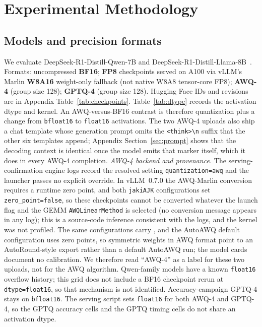\documentclass[11pt,a4paper]{article}
\begin{document}
\section{Experimental Methodology}
\subsection{Models and precision formats}
\label{sec:formats}
We evaluate DeepSeek-R1-Distill-Qwen-7B and DeepSeek-R1-Distill-Llama-8B~\cite{guo2025deepseekr1}. Formats: uncompressed \textbf{BF16}; \textbf{FP8} checkpoints served on A100 via vLLM's Marlin \textbf{W8A16} weight-only fallback (not native W8A8 tensor-core FP8); \textbf{AWQ-4} (group size 128); \textbf{GPTQ-4} (group size 128). Hugging Face IDs and revisions are in Appendix Table~\ref{tab:checkpoints}. Table~\ref{tab:dtype} records the activation dtype and kernel. An AWQ-versus-BF16 contrast is therefore quantization plus a change from \texttt{bfloat16} to \texttt{float16} activations. The two AWQ-4 uploads also ship a chat template whose generation prompt omits the \texttt{<think>\textbackslash n} suffix that the other six templates append; Appendix Section~\ref{sec:prompt} shows that the decoding context is identical once the model emits that marker itself, which it does in every AWQ-4 completion. \emph{AWQ-4 backend and provenance.} The serving-confirmation engine logs record the resolved setting \texttt{quantization=awq} and the launcher passes no explicit override. In vLLM~0.7.0 the AWQ-Marlin conversion requires a runtime zero point, and both \texttt{jakiAJK} configurations set \texttt{zero\_point=false}, so these checkpoints cannot be converted whatever the launch flag and the GEMM \texttt{AWQLinearMethod} is selected (no conversion message appears in any log); this is a source-code inference consistent with the logs, and the kernel was not profiled. The same configurations carry  , and the AutoAWQ default configuration uses zero points, so symmetric weights in AWQ format point to an AutoRound-style export rather than a default AutoAWQ run; the model cards document no calibration. We therefore read ``AWQ-4'' as a label for these two uploads, not for the AWQ algorithm. Qwen-family models have a known \texttt{float16} overflow history; this grid does not include a BF16 checkpoint rerun at \texttt{dtype=float16}, so that mechanism is not identified. Accuracy-campaign GPTQ-4 stays on \texttt{bfloat16}. The serving script sets \texttt{float16} for both AWQ-4 and GPTQ-4, so the GPTQ accuracy cells and the GPTQ timing cells do not share an activation dtype.
\end{document}
